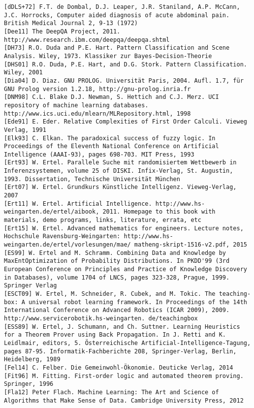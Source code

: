 \documentclass[10pt]{article}
\begin{document}
\begin{verbatim}
[dDLS+72] F.T. de Dombal, D.J. Leaper, J.R. Staniland, A.P. McCann, J.C. Horrocks, Computer aided diagnosis of acute abdominal pain. British Medical Journal 2, 9-13 (1972)
[Dee11] The DeepQA Project, 2011. http://www.research.ibm.com/deepqa/deepqa.shtml
[DH73] R.O. Duda and P.E. Hart. Pattern Classification and Scene Analysis. Wiley, 1973. Klassiker zur Bayes-Decision-Theorie
[DHS01] R.O. Duda, P.E. Hart, and D.G. Stork. Pattern Classification. Wiley, 2001
[Dia04] D. Diaz. GNU PROLOG. Universität Paris, 2004. Aufl. 1.7, für GNU Prolog version 1.2.18, http://gnu-prolog.inria.fr
[DNM98] C.L. Blake D.J. Newman, S. Hettich and C.J. Merz. UCI repository of machine learning databases. http://www.ics.uci.edu/mlearn/MLRepository.html, 1998
[Ede91] E. Eder. Relative Complexities of First Order Calculi. Vieweg Verlag, 1991
[Elk93] C. Elkan. The paradoxical success of fuzzy logic. In Proceedings of the Eleventh National Conference on Artificial Intelligence (AAAI-93), pages 698-703. MIT Press, 1993
[Ert93] W. Ertel. Parallele Suche mit randomisiertem Wettbewerb in Inferenzsystemen, volume 25 of DISKI. Infix-Verlag, St. Augustin, 1993. Dissertation, Technische Universität München
[Ert07] W. Ertel. Grundkurs Künstliche Intelligenz. Vieweg-Verlag, 2007
[Ert11] W. Ertel. Artificial Intelligence. http://www.hs-weingarten.de/ertel/aibook, 2011. Homepage to this book with materials, demo programs, links, literature, errata, etc
[Ert15] W. Ertel. Advanced mathematics for engineers. Lecture notes, Hochschule Ravensburg-Weingarten: http://www.hs-weingarten.de/ertel/vorlesungen/mae/ matheng-skript-1516-v2.pdf, 2015
[ES99] W. Ertel and M. Schramm. Combining Data and Knowledge by MaxEntOptimization of Probability Distributions. In PKDD'99 (3rd European Conference on Principles and Practice of Knowledge Discovery in Databases), volume 1704 of LNCS, pages 323-328, Prague, 1999. Springer Verlag
[ESCT09] W. Ertel, M. Schneider, R. Cubek, and M. Tokic. The teaching-box: A universal robot learning framework. In Proceedings of the 14th International Conference on Advanced Robotics (ICAR 2009), 2009. http://www.servicerobotik.hs-weingarten. de/teachingbox
[ESS89] W. Ertel, J. Schumann, and Ch. Suttner. Learning Heuristics for a Theorem Prover using Back Propagation. In J. Retti and K. Leidlmair, editors, 5. Österreichische Artificial-Intelligence-Tagung, pages 87-95. Informatik-Fachberichte 208, Springer-Verlag, Berlin, Heidelberg, 1989
[Fel14] C. Felber. Die Gemeinwohl-Ökonomie. Deuticke Verlag, 2014
[Fit96] M. Fitting. First-order logic and automated theorem proving. Springer, 1996
[Fla12] Peter Flach. Machine Learning: The Art and Science of Algorithms that Make Sense of Data. Cambridge University Press, 2012

\end{verbatim}
\end{document}
